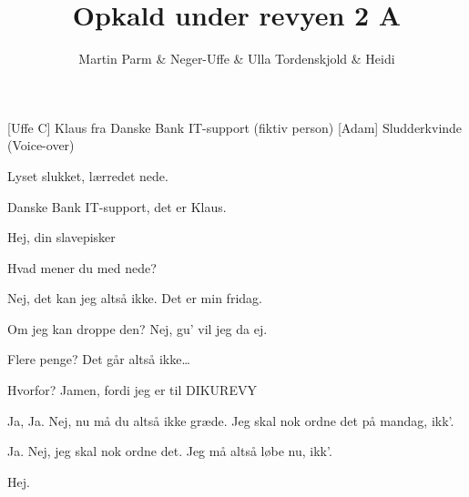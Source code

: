 \documentclass[a4paper]{article}
\title{Opkald under revyen 2 A}
\author{Martin Parm \& Neger-Uffe \& Ulla Tordenskjold \& Heidi}
\begin{document}
\maketitle

\begin{roles}
  [Uffe C] Klaus fra Danske Bank IT-support (fiktiv person)
  [Adam] Sludderkvinde (Voice-over)
\end{roles}

\begin{sketch}
\scene Lyset slukket, lærredet nede.


 Danske Bank IT-support, det er Klaus.


 Hej, din slavepisker


 Hvad mener du med nede?


 Nej, det kan jeg altså ikke. Det er min fridag.


 Om jeg kan droppe den? Nej, gu' vil jeg da ej.


 Flere penge? Det går altså ikke\ldots


 Hvorfor? Jamen, fordi jeg er til DIKUREVY


 Ja, Ja. Nej, nu må du altså ikke græde. Jeg skal nok ordne det på
mandag, ikk'.


 Ja. Nej, jeg skal nok ordne det. Jeg må altså løbe nu, ikk'.


 Hej.
\end{sketch}
\end{document}
